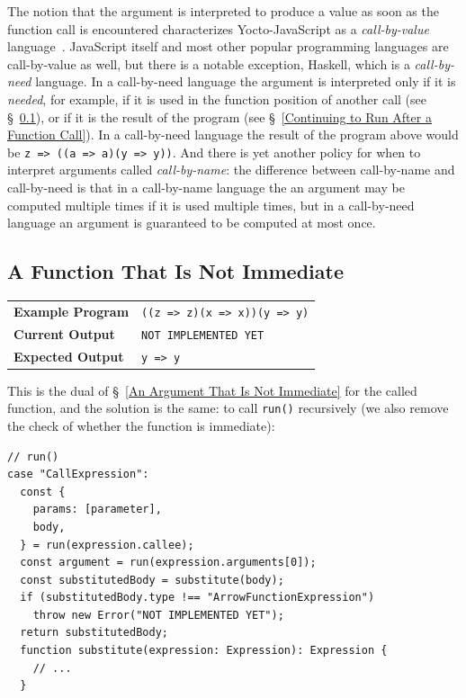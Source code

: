 \documentclass[12pt, oneside]{book}
\begin{document}
\begin{mdframed}[frametitle = {Advanced}]
The notion that the argument is interpreted to produce a value as soon as the function call is encountered characterizes Yocto-JavaScript as a \emph{call-by-value} language~\cite{call-by-name-call-by-value-and-the-lambda-calculus}. JavaScript itself and most other popular programming languages are call-by-value as well, but there is a notable exception, Haskell, which is a \emph{call-by-need} language. In a call-by-need language the argument is interpreted only if it is \emph{needed}, for example, if it is used in the function position of another call (see §~\ref{A Function That Is Not Immediate}), or if it is the result of the program (see §~\ref{Continuing to Run After a Function Call}). In a call-by-need language the result of the program above would be \texttt{z => ((a => a)(y => y))}. And there is yet another policy for when to interpret arguments called \emph{call-by-name}: the difference between call-by-name and call-by-need is that in a call-by-name language the an argument may be computed multiple times if it is used multiple times, but in a call-by-need language an argument is guaranteed to be computed at most once.
\end{mdframed}

\subsection{A Function That Is Not Immediate}
\label{A Function That Is Not Immediate}

\begin{center}
\begin{tabular}{ll}
\textbf{Example Program} & \texttt{((z => z)(x => x))(y => y)} \\
\textbf{Current Output} & \texttt{NOT IMPLEMENTED YET} \\
\textbf{Expected Output} & \texttt{y => y} \\
\end{tabular}
\end{center}

This is the dual of §~\ref{An Argument That Is Not Immediate} for the called function, and the solution is the same: to call \texttt{run()} recursively (we also remove the check of whether the function is immediate):

\begin{verbatim}
// run()
case "CallExpression":
  const {
    params: [parameter],
    body,
  } = run(expression.callee);
  const argument = run(expression.arguments[0]);
  const substitutedBody = substitute(body);
  if (substitutedBody.type !== "ArrowFunctionExpression")
    throw new Error("NOT IMPLEMENTED YET");
  return substitutedBody;
  function substitute(expression: Expression): Expression {
    // ...
  }
\end{verbatim}
\end{document}
